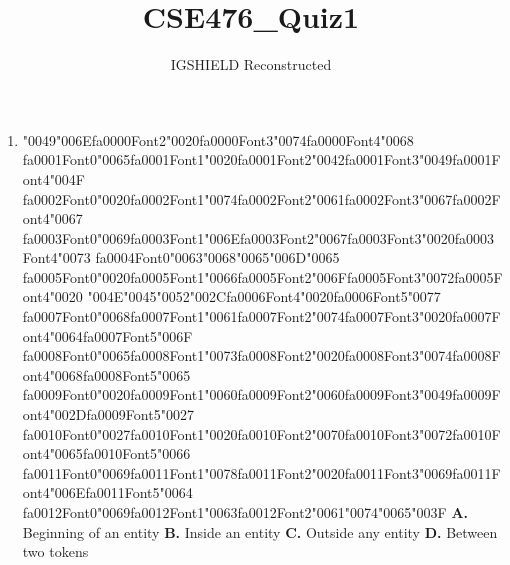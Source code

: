 \documentclass[11pt]{article}
\title{CSE476\_Quiz1}
\author{IGSHIELD Reconstructed}
\date{}
\begin{document}
\maketitle
\begin{enumerate}[leftmargin=*]
  \item {\char"0049}{\char"006E}{\csname fa0000Font2\endcsname\char"0020}{\csname fa0000Font3\endcsname\char"0074}{\csname fa0000Font4\endcsname\char"0068} {\csname fa0001Font0\endcsname\char"0065}{\csname fa0001Font1\endcsname\char"0020}{\csname fa0001Font2\endcsname\char"0042}{\csname fa0001Font3\endcsname\char"0049}{\csname fa0001Font4\endcsname\char"004F} {\csname fa0002Font0\endcsname\char"0020}{\csname fa0002Font1\endcsname\char"0074}{\csname fa0002Font2\endcsname\char"0061}{\csname fa0002Font3\endcsname\char"0067}{\csname fa0002Font4\endcsname\char"0067} {\csname fa0003Font0\endcsname\char"0069}{\csname fa0003Font1\endcsname\char"006E}{\csname fa0003Font2\endcsname\char"0067}{\csname fa0003Font3\endcsname\char"0020}{\csname fa0003Font4\endcsname\char"0073} {\csname fa0004Font0\endcsname\char"0063}{\char"0068}{\char"0065}{\char"006D}{\char"0065} {\csname fa0005Font0\endcsname\char"0020}{\csname fa0005Font1\endcsname\char"0066}{\csname fa0005Font2\endcsname\char"006F}{\csname fa0005Font3\endcsname\char"0072}{\csname fa0005Font4\endcsname\char"0020} {\char"004E}{\char"0045}{\char"0052}{\char"002C}{\csname fa0006Font4\endcsname\char"0020}{\csname fa0006Font5\endcsname\char"0077} {\csname fa0007Font0\endcsname\char"0068}{\csname fa0007Font1\endcsname\char"0061}{\csname fa0007Font2\endcsname\char"0074}{\csname fa0007Font3\endcsname\char"0020}{\csname fa0007Font4\endcsname\char"0064}{\csname fa0007Font5\endcsname\char"006F} {\csname fa0008Font0\endcsname\char"0065}{\csname fa0008Font1\endcsname\char"0073}{\csname fa0008Font2\endcsname\char"0020}{\csname fa0008Font3\endcsname\char"0074}{\csname fa0008Font4\endcsname\char"0068}{\csname fa0008Font5\endcsname\char"0065} {\csname fa0009Font0\endcsname\char"0020}{\csname fa0009Font1\endcsname\char"0060}{\csname fa0009Font2\endcsname\char"0060}{\csname fa0009Font3\endcsname\char"0049}{\csname fa0009Font4\endcsname\char"002D}{\csname fa0009Font5\endcsname\char"0027} {\csname fa0010Font0\endcsname\char"0027}{\csname fa0010Font1\endcsname\char"0020}{\csname fa0010Font2\endcsname\char"0070}{\csname fa0010Font3\endcsname\char"0072}{\csname fa0010Font4\endcsname\char"0065}{\csname fa0010Font5\endcsname\char"0066} {\csname fa0011Font0\endcsname\char"0069}{\csname fa0011Font1\endcsname\char"0078}{\csname fa0011Font2\endcsname\char"0020}{\csname fa0011Font3\endcsname\char"0069}{\csname fa0011Font4\endcsname\char"006E}{\csname fa0011Font5\endcsname\char"0064} {\csname fa0012Font0\endcsname\char"0069}{\csname fa0012Font1\endcsname\char"0063}{\csname fa0012Font2\endcsname\char"0061}{\char"0074}{\char"0065}{\char"003F}
    \textbf{A.} Beginning of an entity
    \textbf{B.} Inside an entity
    \textbf{C.} Outside any entity
    \textbf{D.} Between two tokens


\end{enumerate}
\end{document}
